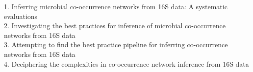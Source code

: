 
\begin{titlepage}

  \newcommand{\HRule}{\rule{\linewidth}{0.5mm}} %

  \center %





  \vspace*{\fill}
  {\huge 1. Inferring microbial co-occurrence networks from 16S data: A systematic evaluations}\\[0.4cm]
  {\huge  2. Investigating the best practices for inference of microbial co-occurrence networks from 16S data}\\[0.4cm] %
  {\huge  3. Attempting to find the best practice pipeline for inferring co-occurrence networks from 16S data}\\[0.4cm] %
  {\huge  4. Deciphering the complexities in co-occurrence network inference from 16S data}\\[0.4cm] %






  \vspace*{\fill} %

\end{titlepage}


\newpage
